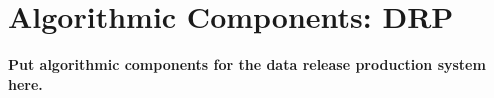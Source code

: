 \section{Algorithmic Components: DRP}

{\bf Put algorithmic components for the data release production system here.}